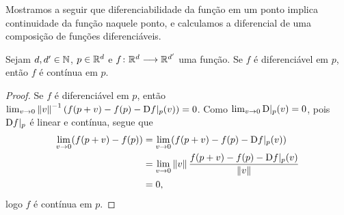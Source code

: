 Mostramos a seguir que diferenciabilidade da função em um ponto implica continuidade da função naquele ponto, e calculamos a diferencial de uma composição de funções diferenciáveis.

\begin{proposition}
Sejam $d,d' \in \mathbb{N}$, $p \in \mathbb{R}^d$ e ${f}\colon {\mathbb{R}^d} \longrightarrow {\mathbb{R}^{d'}}$ uma função. Se $f$ é diferenciável em $p$, então $f$ é contínua em $p$.
\end{proposition}
\begin{proof}
Se $f$ é diferenciável em $p$, então $\lim_{v \rightarrow 0} \left\Vert{v}\right\Vert^{-1}(f(p+v)-f(p)-\mathrm{D} f|_p(v)) = 0$. Como $\lim_{v \rightarrow 0} \mathrm{D}|_p (v)= 0$, pois $\mathrm{D} f|_p$ é linear e contínua, segue que
	\begin{align*}
	\lim_{v \rightarrow 0} (f(p+v)-f(p)) &= \lim_{v \rightarrow 0}(f(p+v)-f(p)-\mathrm{D} f|_p(v)) \\
		&= \lim_{v \rightarrow 0}\left\Vert{v}\right\Vert \frac{f(p+v)-f(p)-\mathrm{D} f|_p(v)}{\left\Vert{v}\right\Vert} \\
		&= 0,
	\end{align*}
logo $f$ é contínua em $p$.
\end{proof}

